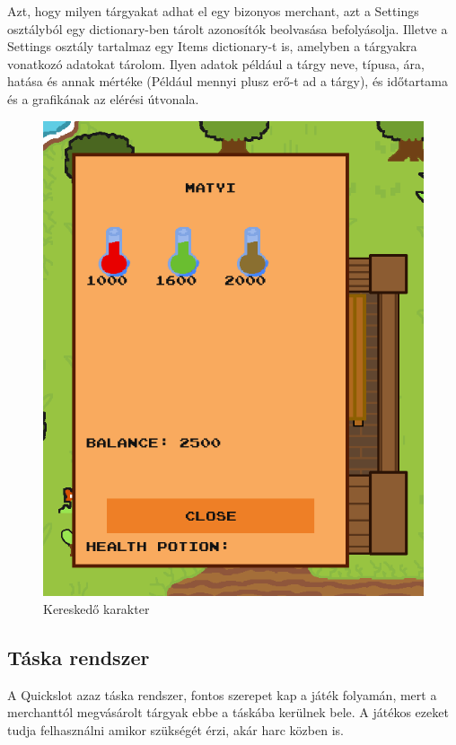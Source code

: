 Azt, hogy milyen tárgyakat adhat el egy bizonyos merchant, azt a Settings osztályból egy dictionary-ben tárolt azonosítók beolvasása befolyásolja.
 Illetve a Settings osztály tartalmaz egy Items dictionary-t is, amelyben a tárgyakra vonatkozó adatokat tárolom.
  Ilyen adatok például a tárgy neve, típusa, ára, hatása és annak mértéke (Például mennyi plusz erő-t ad a tárgy),
   és időtartama és a grafikának az elérési útvonala.  

\begin{figure}[H]
    \centering
    \includegraphics[width=9.0truecm]{images/merchant.png}
    \caption{Kereskedő karakter}
    \label{fig:Merchant}
\end{figure}


\subsection{Táska rendszer}

 A Quickslot azaz táska rendszer, fontos szerepet kap a játék folyamán, mert a merchanttól megvásárolt tárgyak ebbe a táskába kerülnek bele. A játékos ezeket tudja felhasználni amikor szükségét érzi, akár harc közben is.

